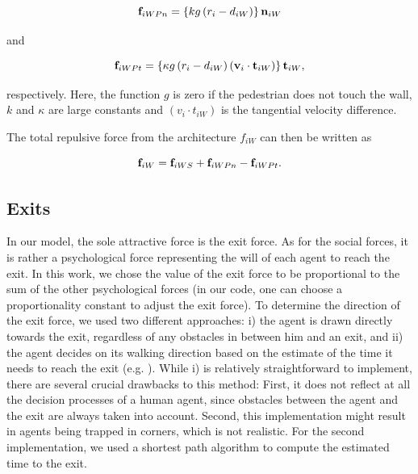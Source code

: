 \documentclass[11pt]{article}
\begin{document}
\begin{equation}
	{{\bf f}_{iWPn}} = \left\{ {kg\left( {{r_i} - {d_{iW}}} \right)} \right\}{{\bf n}_{iW}}
	\label{eq:fiWPn}
\end{equation}

and

\begin{equation}
	{{\bf f}_{iWPt}} = \left\{ {\kappa g\left( {{r_i} - {d_{iW}}} \right)\left( {{{\bf v}_i} \cdot {{\bf t}_{iW}}} \right)} \right\}{{\bf t}_{iW}} ,
	\label{eq:fiWPt}
\end{equation}

respectively. Here, the function $g$ is zero if the pedestrian does not touch the wall, $k$ and $\kappa$ are large constants and $(v_i \cdot t_{iW})$ is the tangential velocity difference.

The total repulsive force from the architecture $f_{iW}$ can then be written as

\begin{equation}
	{{\bf f}_{iW}} = {{\bf f}_{iWS}} + {{\bf f}_{iWPn}} - {{\bf f}_{iWPt}} .
	\label{eq:fiW}
\end{equation}



\subsection{Exits}
\label{sec:Exits1}

In our model, the sole attractive force is the exit force. As for the social forces, it is rather a psychological force representing the will of each agent to reach the exit. In this work, we chose the value of the exit force to be proportional to the sum of the other psychological forces (in our code, one can choose a proportionality constant to adjust the exit force). To determine the direction of the exit force, we used two different approaches: i) the agent is drawn directly towards the exit, regardless of any obstacles in between him and an exit, and ii) the agent decides on its walking direction based on the estimate of the time it needs to reach the exit (e.g. \citet{Graf,Kneidl}).
While i) is relatively straightforward to implement, there are several crucial drawbacks to this method: First, it does not reflect at all the decision processes of a human agent, since obstacles between the agent and the exit are always taken into account. Second, this implementation might result in agents being trapped in corners, which is not realistic. For the second implementation, we used a shortest path algorithm to compute the estimated time to the exit.
\end{document}
